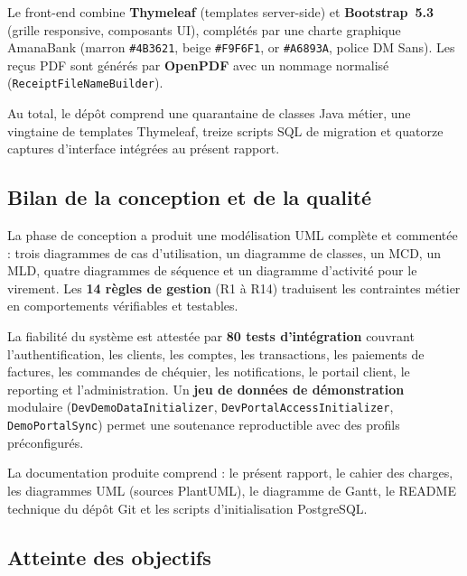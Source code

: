 \documentclass[11pt,a4paper,oneside]{report}
\begin{document}
Le front-end combine \textbf{Thymeleaf} (templates server-side) et \textbf{Bootstrap~5.3} (grille responsive, composants UI), complétés par une charte graphique AmanaBank (marron \texttt{\#4B3621}, beige \texttt{\#F9F6F1}, or \texttt{\#A6893A}, police DM Sans). Les reçus PDF sont générés par \textbf{OpenPDF} avec un nommage normalisé (\texttt{ReceiptFileNameBuilder}).

Au total, le dépôt comprend une quarantaine de classes Java métier, une vingtaine de templates Thymeleaf, treize scripts SQL de migration et quatorze captures d'interface intégrées au présent rapport.

\subsection*{Bilan de la conception et de la qualité}

La phase de conception a produit une modélisation UML complète et commentée : trois diagrammes de cas d'utilisation, un diagramme de classes, un MCD, un MLD, quatre diagrammes de séquence et un diagramme d'activité pour le virement. Les \textbf{14 règles de gestion} (R1 à R14) traduisent les contraintes métier en comportements vérifiables et testables.

La fiabilité du système est attestée par \textbf{80 tests d'intégration} couvrant l'authentification, les clients, les comptes, les transactions, les paiements de factures, les commandes de chéquier, les notifications, le portail client, le reporting et l'administration. Un \textbf{jeu de données de démonstration} modulaire (\texttt{DevDemoDataInitializer}, \texttt{DevPortalAccessInitializer}, \texttt{DemoPortalSync}) permet une soutenance reproductible avec des profils préconfigurés.

La documentation produite comprend : le présent rapport, le cahier des charges, les diagrammes UML (sources PlantUML), le diagramme de Gantt, le README technique du dépôt Git et les scripts d'initialisation PostgreSQL.

\subsection*{Atteinte des objectifs}
\end{document}
